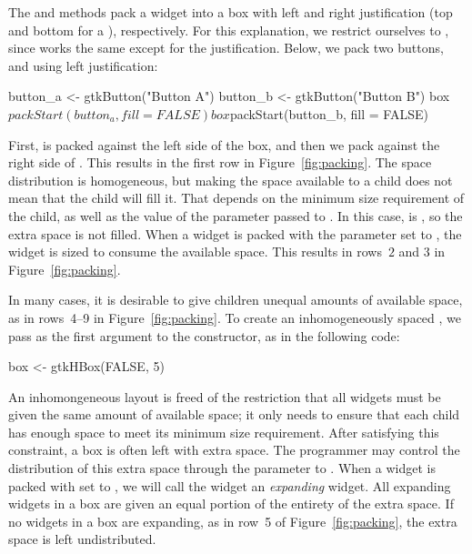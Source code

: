 The  and  methods pack a
widget into a box with left and right justification (top and
bottom for a ), respectively. For this explanation, we
restrict ourselves to , since
 works the same except for the
justification. Below, we pack two buttons,  and
 using left justification:
\begin{Schunk}
\begin{Sinput}
 button_a <- gtkButton("Button A")
 button_b <- gtkButton("Button B")
 box$packStart(button_a, fill = FALSE)
 box$packStart(button_b, fill = FALSE)
\end{Sinput}
\end{Schunk}
%
First,  is packed against the left side of the box,
and then we pack  against the right side of
. This results in the first row in
Figure~\ref{fig:packing}. The space distribution is homogeneous, but
making the space available to a child does not mean that the child
will fill it. That depends on the minimum size requirement of the
child, as well as the value of the 
parameter passed to . In this case,
 is , so the extra space
is not filled. When a widget is packed with the
 parameter set to , the
widget is sized to consume the available space. This results in
rows~$2$ and $3$ in Figure~\ref{fig:packing}.

In many cases, it is desirable to give children unequal amounts of
available space, as in rows~4--9 in Figure~\ref{fig:packing}. 
To create an inhomogeneously spaced , we pass
 as the first argument to the constructor, as in the
following code:
\begin{Schunk}
\begin{Sinput}
 box <- gtkHBox(FALSE, 5)
\end{Sinput}
\end{Schunk}

An inhomongeneous layout is freed of the restriction that all widgets
must be given the same amount of available space; it only needs to
ensure that each child has enough space to meet its minimum size
requirement. After satisfying this constraint, a box is often left
with extra space. The programmer may control the distribution of this
extra space through the  parameter
to .  When a widget is packed with
 set to , we will call
the widget an \emph{expanding} widget. All expanding widgets in a box
are given an equal portion of the entirety of the extra space. If no
widgets in a box are expanding, as in row~5 of
Figure~\ref{fig:packing}, the extra space is left undistributed. 

